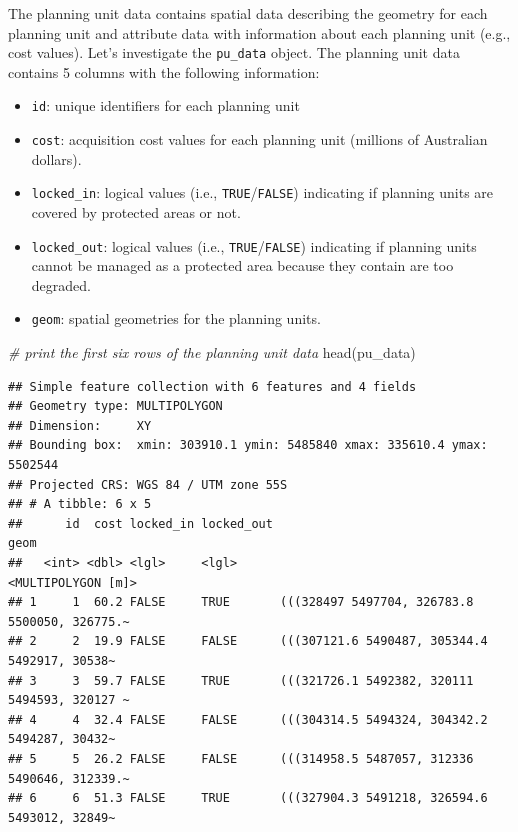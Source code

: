 \documentclass[
  12pt,
]{book}
\newenvironment{Shaded}{\begin{snugshade}}{\end{snugshade}}
\newcommand{\CommentTok}[1]{\textcolor[rgb]{0.56,0.35,0.01}{\textit{#1}}}
\newcommand{\FunctionTok}[1]{\textcolor[rgb]{0.00,0.00,0.00}{#1}}
\newcommand{\NormalTok}[1]{#1}
\providecommand{\tightlist}{%
  \setlength{\itemsep}{0pt}\setlength{\parskip}{0pt}}
\begin{document}
The planning unit data contains spatial data describing the geometry for each planning unit and attribute data with information about each planning unit (e.g., cost values). Let's investigate the \texttt{pu\_data} object. The planning unit data contains 5 columns with the following information:

\begin{itemize}
\tightlist
\item
  \texttt{id}: unique identifiers for each planning unit
\item
  \texttt{cost}: acquisition cost values for each planning unit (millions of Australian dollars).
\item
  \texttt{locked\_in}: logical values (i.e., \texttt{TRUE}/\texttt{FALSE}) indicating if planning units are covered by protected areas or not.
\item
  \texttt{locked\_out}: logical values (i.e., \texttt{TRUE}/\texttt{FALSE}) indicating if planning units cannot be managed as a protected area because they contain are too degraded.
\item
  \texttt{geom}: spatial geometries for the planning units.
\end{itemize}

\begin{Shaded}
\begin{Highlighting}[]
\CommentTok{\# print the first six rows of the planning unit data}
\FunctionTok{head}\NormalTok{(pu\_data)}
\end{Highlighting}
\end{Shaded}

\begin{verbatim}
## Simple feature collection with 6 features and 4 fields
## Geometry type: MULTIPOLYGON
## Dimension:     XY
## Bounding box:  xmin: 303910.1 ymin: 5485840 xmax: 335610.4 ymax: 5502544
## Projected CRS: WGS 84 / UTM zone 55S
## # A tibble: 6 x 5
##      id  cost locked_in locked_out                                          geom
##   <int> <dbl> <lgl>     <lgl>                                 <MULTIPOLYGON [m]>
## 1     1  60.2 FALSE     TRUE       (((328497 5497704, 326783.8 5500050, 326775.~
## 2     2  19.9 FALSE     FALSE      (((307121.6 5490487, 305344.4 5492917, 30538~
## 3     3  59.7 FALSE     TRUE       (((321726.1 5492382, 320111 5494593, 320127 ~
## 4     4  32.4 FALSE     FALSE      (((304314.5 5494324, 304342.2 5494287, 30432~
## 5     5  26.2 FALSE     FALSE      (((314958.5 5487057, 312336 5490646, 312339.~
## 6     6  51.3 FALSE     TRUE       (((327904.3 5491218, 326594.6 5493012, 32849~
\end{verbatim}
\end{document}
